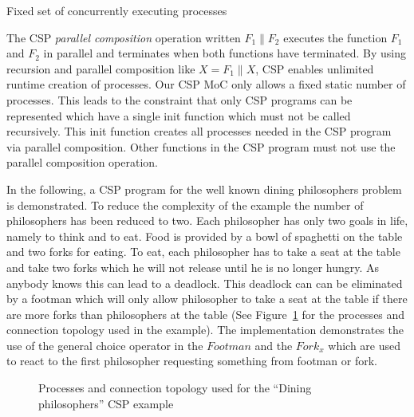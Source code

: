 \begin{characteristic}\label{characteristic-csp-concurrent-processes}
  Fixed set of concurrently executing processes
  
  The CSP \emph{parallel composition} operation written $F_1 \| F_2$ executes the
  function $F_1$ and $F_2$ in parallel and terminates when both functions
  have terminated. By using recursion and parallel composition
  like $X = F_1 \| X$, CSP enables unlimited runtime creation of processes.
  Our CSP MoC only allows a fixed static number of processes. This
  leads to the constraint that only CSP programs can be represented which
  have a single init function which must not be called recursively. This init
  function creates all processes needed in the CSP program via parallel composition.
  Other functions in the CSP program must not use the parallel composition
  operation.
\end{characteristic}

%  

In the following, a CSP program for the well known dining
philosophers problem is demonstrated. To reduce the complexity
of the example the number of philosophers has been reduced
to two. Each philosopher has only two goals in life, namely to think and
to eat. Food is provided by a bowl of spaghetti on the table and
two forks for eating. To eat, each philosopher has to take a seat
at the table and take two forks which he will not release until he
is no longer hungry. As anybody knows this can lead to a deadlock.
This deadlock can can be eliminated by a footman which will only
allow philosopher to take a seat at the table if there are more
forks than philosophers at the table (See Figure~\ref{fig:dining-philosophers}
for the processes and connection topology used in the example).
The implementation demonstrates the use of the general choice operator
in the $Footman$ and the $Fork_{x}$ which are used to react to the first
philosopher requesting something from footman or fork.

\begin{figure}[h]
\centering

\caption{Processes and connection topology used for the ``Dining philosophers'' CSP example}
\label{fig:dining-philosophers}
\end{figure}

